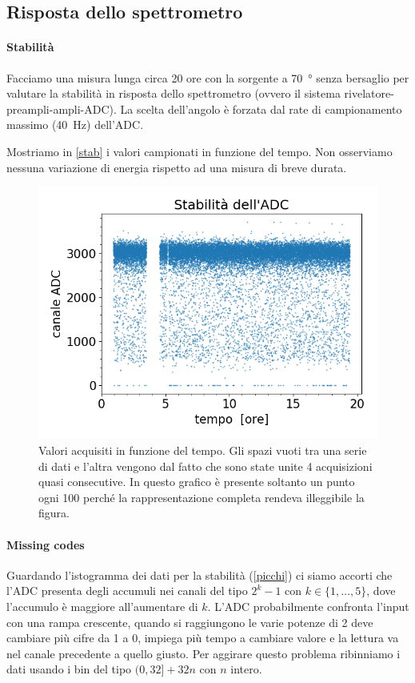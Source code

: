 \subsection{Risposta dello spettrometro}

\paragraph{Stabilità} Facciamo una misura lunga circa 20 ore con la sorgente a \SI{70}{\degree} senza bersaglio per valutare la stabilità in risposta dello spettrometro (ovvero il sistema rivelatore-preampli-ampli-ADC).
La scelta dell'angolo è forzata dal rate di campionamento massimo (\SI{40}{Hz}) dell'ADC.

Mostriamo in \autoref{stab} i valori campionati in funzione del tempo. Non osserviamo nessuna variazione di energia rispetto ad una misura di breve durata.

\begin{figure}[h]
\centering
\includegraphics[width=30 em]{immagini/stab.png}
\caption{Valori acquisiti in funzione del tempo. Gli spazi vuoti tra una serie di dati e l'altra vengono dal fatto che sono state unite 4 acquisizioni quasi consecutive.
In questo grafico è presente soltanto un punto ogni 100 perché la rappresentazione completa rendeva illeggibile la figura.}
\label{stab}
\end{figure}

\paragraph{Missing codes}

Guardando l'istogramma dei dati per la stabilità (\autoref{picchi})
ci siamo accorti che l'ADC presenta degli accumuli nei canali del tipo $2^{k} - 1$ con $k\in\{1,\dots,5\}$,
dove l'accumulo è maggiore all'aumentare di $k$.
L'ADC probabilmente confronta l'input con una rampa crescente,
quando si raggiungono le varie potenze di 2 deve cambiare più cifre da 1 a 0,
impiega più tempo a cambiare valore e la lettura va nel canale precedente a quello giusto.
Per aggirare questo problema ribinniamo i dati usando i bin del tipo $(0,32]+32n$ con $n$ intero.

